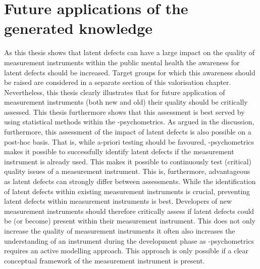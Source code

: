 \section*{Future applications of the generated knowledge}
As this thesis shows that latent defects can have a large impact on the quality of measurement instruments within the public mental health the awareness for latent defects should be increased. 
Target groups for which this awareness should be raised are considered in a separate section of this valorisation chapter. 
Nevertheless, this thesis clearly illustrates that for future application of measurement instruments (both new and old) their quality should be critically assessed. 
This thesis furthermore shows that this assessment is best served by using statistical methods within the \textbeta-psychometrics. 
As argued in the discussion, furthermore, this assessment of the impact of latent defects is also possible on a post-hoc basis. 
That is, while a-priori testing should be favoured, \textbeta-psychometrics makes it possible to successfully identify latent defects if the measurement instrument is already used. 
This makes it possible to continuously test (critical) quality issues of a measurement instrument. 
This is, furthermore, advantageous as latent defects can strongly differ between assessments. 
While the identification of latent defects within existing measurement instruments is crucial, preventing latent defects within measurement instruments is best. 
Developers of new measurement instruments should therefore critically assess if latent defects could be (or become) present within their measurement instrument. 
This does not only increase the quality of measurement instruments it often also increases the understanding of an instrument during the development phase as \textbeta-psychometrics requires an active modelling approach. 
This approach is only possible if a clear conceptual framework of the measurement instrument is present.

